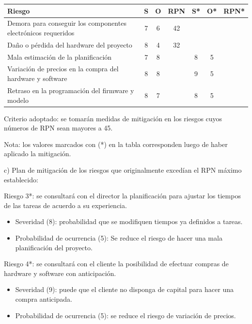 \documentclass[
11pt, %
]{charter}
\begin{document}
\begin{table}[htpb]
\centering
\begin{tabularx}{\linewidth}{@{}|X|c|c|c|c|c|c|@{}}
\hline
\rowcolor[HTML]{C0C0C0} 
Riesgo & S & O & RPN & S* & O* & RPN* \\ \hline
Demora para conseguir los componentes electrónicos requeridos & 7 & 6 & 42  &    &    &      \\ \hline
Daño o pérdida del hardware del proyecto & 8 & 4 & 32  &    &    &      \\ \hline
Mala estimación de la planificación & 7 & 8 & \cellcolor{red}{56}  & 8  & 5  & \cellcolor{green}{40}   \\ \hline
Variación de precios en la compra del hardware y software & 8 & 8 & \cellcolor{red}{64}  & 9 & 5  & \cellcolor{green}{45}   \\ \hline
Retraso en la programación del firmware y modelo & 8 & 7 & \cellcolor{red}{56}  & 8  & 5  & \cellcolor{green}{40}   \\ \hline
\end{tabularx}%
\end{table}

Criterio adoptado: se tomarán medidas de mitigación en los riesgos cuyos números de RPN sean mayores a 45.

Nota: los valores marcados con (*) en la tabla corresponden luego de haber aplicado la mitigación.

c) Plan de mitigación de los riesgos que originalmente excedían el RPN máximo establecido:
 
Riesgo 3*: se consultará con el director la planificación para ajustar los tiempos de las tareas de acuerdo a su experiencia.
  \begin{itemize}
	\item Severidad (8): probabilidad que se modifiquen tiempos ya definidos a tareas.
	\item Probabilidad de ocurrencia (5): Se reduce el riesgo de hacer una mala planificación del proyecto.
	\end{itemize}

Riesgo 4*: se consultará con el cliente la posibilidad de efectuar compras de hardware y software con anticipación.
  \begin{itemize}
	\item Severidad (9): puede que el cliente no disponga de capital para hacer una compra anticipada.
	\item Probabilidad de ocurrencia (5): se reduce el riesgo de variación de precios.
	\end{itemize}
\end{document}
